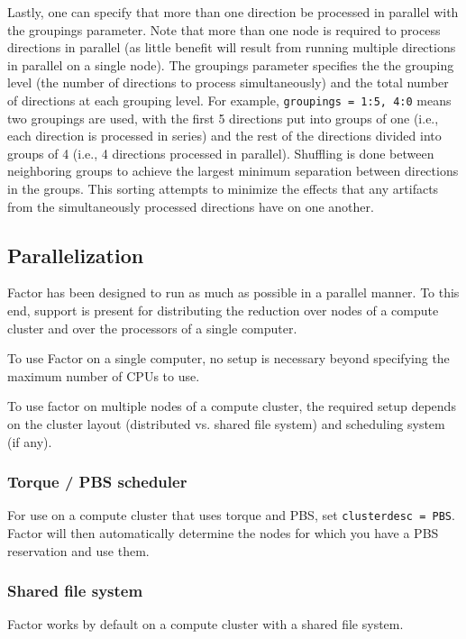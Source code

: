 \documentclass[structabstract]{article}
\begin{document}
{Lastly, one can specify that more than one direction be processed in parallel
with the groupings parameter. Note that more than one node is required to
process directions in parallel (as little benefit will result from running
multiple directions in parallel on a single node). The groupings parameter
specifies the the grouping level (the number of directions to process
simultaneously) and the total number of directions at each grouping level. For
example, {\tt groupings = 1:5, 4:0} means two groupings are used, with the first
5 directions put into groups of one (i.e., each direction is processed in
series) and the rest of the directions divided into groups of 4 (i.e., 4
directions processed in parallel). Shuffling is done between neighboring groups
to achieve the largest minimum separation between directions in the groups. This
sorting attempts to minimize the effects that any artifacts from the
simultaneously processed directions have on one another.


\subsection{Parallelization}
\label{factor:parallel}

Factor has been designed to run as much as possible in a parallel manner. To
this end, support is present for distributing the reduction over nodes of a
compute cluster and over the processors of a single computer.

To use Factor on a single computer, no setup is necessary beyond specifying the
maximum number of CPUs to use.

To use factor on multiple nodes of a compute cluster, the required setup depends
on the cluster layout (distributed vs. shared file system) and scheduling system
(if any).

\subsubsection{Torque / PBS scheduler}
For use on a compute cluster that uses torque and PBS, set {\tt clusterdesc =
PBS}. Factor will then automatically determine the nodes for which you have a
PBS reservation and use them.

\subsubsection{Shared file system}
Factor works by default on a compute cluster with a shared file system.

}
\end{document}
